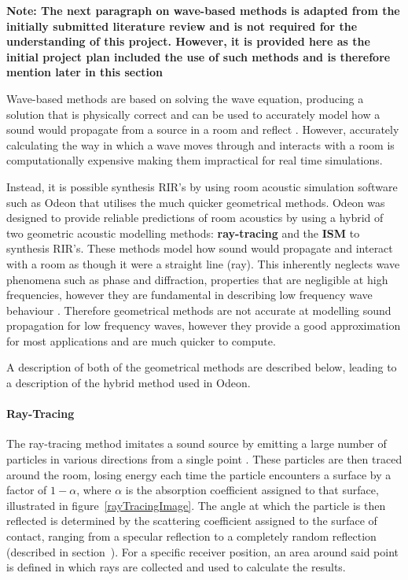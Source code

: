 \documentclass[../../main.tex]{subfiles}
\begin{document}
			\textbf{Note: The next paragraph on wave-based methods is adapted from the initially submitted literature review and is not required for the understanding of this project. However, it is provided here as the initial project plan included the use of such methods and is therefore mention later in this section}

			Wave-based methods are based on solving the wave equation, producing a solution that is physically correct and can be used to accurately model how a sound would propagate from a source in a room and reflect \cite{Siltanen2010}. However, accurately calculating the way in which a wave moves through and interacts with a room is computationally expensive making them impractical for real time simulations.

			Instead, it is possible synthesis \ac{RIR}'s by using room acoustic simulation software such as Odeon \cite{odeon} that utilises the much quicker geometrical methods. Odeon was designed to provide reliable predictions of room acoustics by using a hybrid of two geometric acoustic modelling methods: \textbf{ray-tracing} and the \textbf{\ac{ISM}} to synthesis \ac{RIR}'s. These methods model how sound would propagate and interact with a room as though it were a straight line (ray). This inherently neglects wave phenomena such as phase and diffraction, properties that are negligible at high frequencies, however they are fundamental in describing low frequency wave behaviour \cite{Siltanen2010}. Therefore geometrical methods are not accurate at modelling sound propagation for low frequency waves, however they provide a good approximation for most applications and are much quicker to compute.

			A description of both of the geometrical methods are described below, leading to a description of the hybrid method used in Odeon.

		\paragraph{Ray-Tracing}
		\label{rayTracing}
			The ray-tracing method imitates a sound source by emitting a large number of particles in various directions from a single point \cite{Rindel1995}. These particles are then traced around the room,  losing energy each time the particle encounters a surface by a factor of $1 - \alpha$, where $\alpha$ is the absorption coefficient assigned to that surface, illustrated in figure~\ref{rayTracingImage}. The angle at which the particle is then reflected is determined by the scattering coefficient assigned to the surface of contact, ranging from a specular reflection to a completely random reflection \cite{odeonManual} (described in section~). For a specific receiver position, an area around said point is defined in which rays are collected and used to calculate the results.
\end{document}
